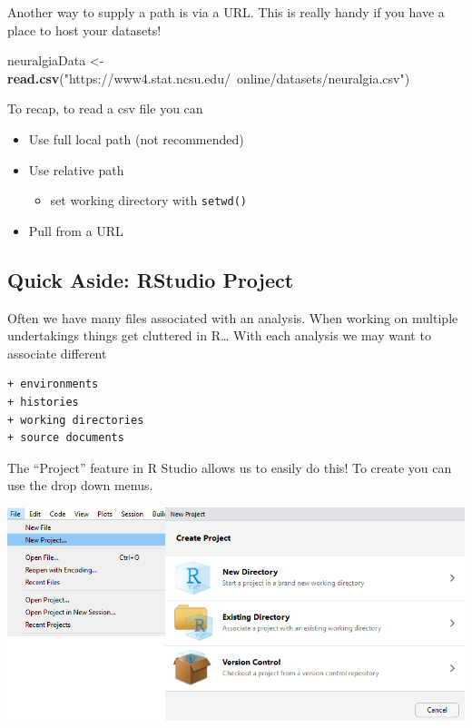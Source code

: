 \documentclass[
]{book}
\newenvironment{Shaded}{\begin{snugshade}}{\end{snugshade}}
\newcommand{\KeywordTok}[1]{\textcolor[rgb]{0.13,0.29,0.53}{\textbf{#1}}}
\newcommand{\NormalTok}[1]{#1}
\newcommand{\StringTok}[1]{\textcolor[rgb]{0.31,0.60,0.02}{#1}}
\providecommand{\tightlist}{%
  \setlength{\itemsep}{0pt}\setlength{\parskip}{0pt}}
\theoremstyle{definition}
\theoremstyle{definition}
\theoremstyle{definition}
\theoremstyle{remark}
\begin{document}
Another way to supply a path is via a URL. This is really handy if you have a place to host your datasets!

\begin{Shaded}
\begin{Highlighting}[]
\NormalTok{neuralgiaData <-}\StringTok{ }\KeywordTok{read.csv}\NormalTok{(}\StringTok{"https://www4.stat.ncsu.edu/~online/datasets/neuralgia.csv"}\NormalTok{)}
\end{Highlighting}
\end{Shaded}

To recap, to read a csv file you can

\begin{itemize}
\item
  Use full local path (not recommended)
\item
  Use relative path

  \begin{itemize}
  \tightlist
  \item
    set working directory with \texttt{setwd()}
  \end{itemize}
\item
  Pull from a URL
\end{itemize}

\hypertarget{quick-aside-rstudio-project}{%
\subsection{Quick Aside: RStudio Project}\label{quick-aside-rstudio-project}}

Often we have many files associated with an analysis. When working on multiple undertakings things get cluttered in R\ldots{} With each analysis we may want to associate different

\begin{verbatim}
+ environments  
+ histories  
+ working directories  
+ source documents  
\end{verbatim}

The ``Project'' feature in R Studio allows us to easily do this! To create you can use the drop down menus.

\begin{center}\includegraphics[width=0.8\linewidth]{img/project} \end{center}
\end{document}
